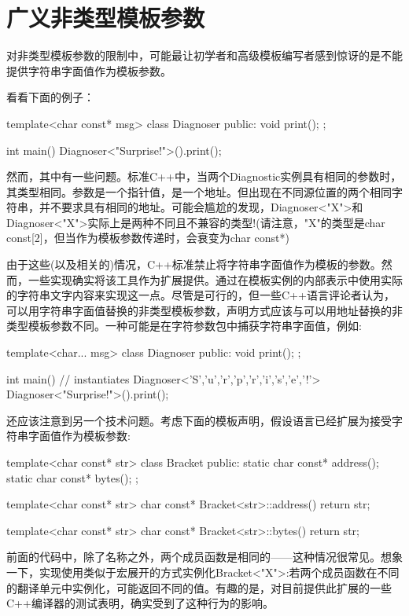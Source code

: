 \section{广义非类型模板参数}
对非类型模板参数的限制中，可能最让初学者和高级模板编写者感到惊讶的是不能提供字符串字面值作为模板参数。

看看下面的例子：

\begin{cpp}
template<char const* msg>
class Diagnoser {
	public:
	void print();
};

int main()
{
	Diagnoser<"Surprise!">().print();
}
\end{cpp}

然而，其中有一些问题。标准C++中，当两个Diagnostic实例具有相同的参数时，其类型相同。参数是一个指针值，是一个地址。但出现在不同源位置的两个相同字符串，并不要求具有相同的地址。可能会尴尬的发现，Diagnoser<"X">和Diagnoser<"X">实际上是两种不同且不兼容的类型!(请注意，"X"的类型是char const[2]，但当作为模板参数传递时，会衰变为char const*)

由于这些(以及相关的)情况，C++标准禁止将字符串字面值作为模板的参数。然而，一些实现确实将该工具作为扩展提供。通过在模板实例的内部表示中使用实际的字符串文字内容来实现这一点。尽管是可行的，但一些C++语言评论者认为，可以用字符串字面值替换的非类型模板参数，声明方式应该与可以用地址替换的非类型模板参数不同。一种可能是在字符参数包中捕获字符串字面值，例如:

\begin{cpp}
template<char... msg>
class Diagnoser {
	public:
	void print();
};

int main()
{
	// instantiates Diagnoser<'S','u','r','p','r','i','s','e','!'>
	Diagnoser<"Surprise!">().print();
}
\end{cpp}

还应该注意到另一个技术问题。考虑下面的模板声明，假设语言已经扩展为接受字符串字面值作为模板参数:

\begin{cpp}
template<char const* str>
class Bracket {
	public:
	static char const* address();
	static char const* bytes();
};

template<char const* str>
char const* Bracket<str>::address()
{
	return str;
}

template<char const* str>
char const* Bracket<str>::bytes()
{
	return str;
}
\end{cpp}

前面的代码中，除了名称之外，两个成员函数是相同的——这种情况很常见。想象一下，实现使用类似于宏展开的方式实例化Bracket<"X">:若两个成员函数在不同的翻译单元中实例化，可能返回不同的值。有趣的是，对目前提供此扩展的一些C++编译器的测试表明，确实受到了这种行为的影响。

